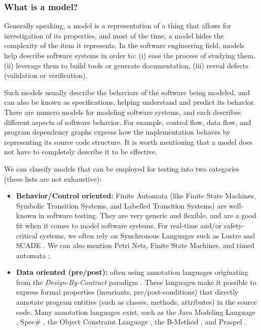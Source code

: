 \subsubsection{What is a model?}
\label{sec:related:testing:model}

Generally speaking, a model is a representation of a thing that
allows for investigation of its properties, and most of the time,
a model hides the complexity of the item it represents. In the
software engineering field, models help describe software systems
in order to: (i) ease the process of studying them, (ii) leverage
them to build tools or generate documentation, (iii) reveal
defects (validation or verification).

Such models usually describe the behaviors of the software being
modeled, and can also be known as specifications, helping
understand and predict its behavior. There are numero models for
modeling software systems, and each describes different aspects
of software behavior. For example, control flow, data flow, and
program dependency graphs express how the implementation behaves
by representing its source code structure. It is worth mentioning
that a model does not have to completely describe it to be
effective.

We can classify models that can be employed for testing into two
categories (these lists are not exhaustive):

\begin{itemize}
    \item \textbf{Behavior/Control oriented:} Finite Automata (like
        Finite State Machines, Symbolic Transition Systems, and Labelled
        Transition Systems) are well-known in software testing. They are
        very generic and flexible, and are a good fit when it comes to
        model software systems. For real-time and/or safety-critical
        systems, we often rely on Synchronous Languages such as Lustre
        \cite{lustre:ieee} and SCADE
        \cite{LeSergent:2011:SCF:2188575.2188578}. We can also mention
        Petri Nets, Finite State Machines, and timed automata
        \cite{Alur94atheory};

    \item \textbf{Data oriented (pre/post):} often using annotation
        languages originating from the \textit{Design-By-Contract}
        paradigm \cite{Meyer:1992:ADC:618974.619797}. These languages
        make it possible to express formal properties (invariants,
        pre/post-conditions) that directly annotate program entities
        (such as classes, methods, attributes) in the source code. Many
        annotation languages exist, such as the Java Modeling Language
        \cite{jml}, Spec\# \cite{117852}, the Object Constraint Language
        \cite{Warmer:1998:OCL:291202}, the B-Method
        \cite{Lano:1996:BLM:525749}, and Praspel
\cite{Enderlin:2011:PSL:2075545.2075551}.
\end{itemize}

